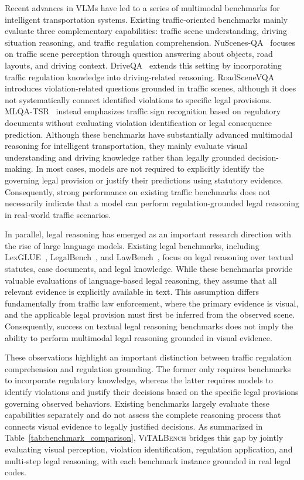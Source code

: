 Recent advances in VLMs have led to a series of multimodal benchmarks for intelligent transportation systems. Existing traffic-oriented benchmarks mainly evaluate three complementary capabilities: traffic scene understanding, driving situation reasoning, and traffic regulation comprehension. NuScenes-QA~\cite{qian2024nuscenesqa} focuses on traffic scene perception through question answering about objects, road layouts, and driving context. DriveQA~\cite{wei2025driveqa} extends this setting by incorporating traffic regulation knowledge into driving-related reasoning. RoadSceneVQA~\cite{guan2026roadscenevqa} introduces violation-related questions grounded in traffic scenes, although it does not systematically connect identified violations to specific legal provisions. MLQA-TSR~\cite{luu2025vlsp} instead emphasizes traffic sign recognition based on regulatory documents without evaluating violation identification or legal consequence prediction. Although these benchmarks have substantially advanced multimodal reasoning for intelligent transportation, they mainly evaluate visual understanding and driving knowledge rather than legally grounded decision-making. In most cases, models are not required to explicitly identify the governing legal provision or justify their predictions using statutory evidence. Consequently, strong performance on existing traffic benchmarks does not necessarily indicate that a model can perform regulation-grounded legal reasoning in real-world traffic scenarios.

In parallel, legal reasoning has emerged as an important research direction with the rise of large language models. Existing legal benchmarks, including LexGLUE~\cite{chalkidis2022lexglue}, LegalBench~\cite{guha2023legalbench}, and LawBench~\cite{fei2024lawbench}, focus on legal reasoning over textual statutes, case documents, and legal knowledge. While these benchmarks provide valuable evaluations of language-based legal reasoning, they assume that all relevant evidence is explicitly available in text. This assumption differs fundamentally from traffic law enforcement, where the primary evidence is visual, and the applicable legal provision must first be inferred from the observed scene. Consequently, success on textual legal reasoning benchmarks does not imply the ability to perform multimodal legal reasoning grounded in visual evidence.

These observations highlight an important distinction between traffic regulation comprehension and regulation grounding. The former only requires benchmarks to incorporate regulatory knowledge, whereas the latter requires models to identify violations and justify their decisions based on the specific legal provisions governing observed behaviors. Existing benchmarks largely evaluate these capabilities separately and do not assess the complete reasoning process that connects visual evidence to legally justified decisions. As summarized in Table~\ref{tab:benchmark_comparison}, \textsc{ViTALBench} bridges this gap by jointly evaluating visual perception, violation identification, regulation application, and multi-step legal reasoning, with each benchmark instance grounded in real legal codes.
